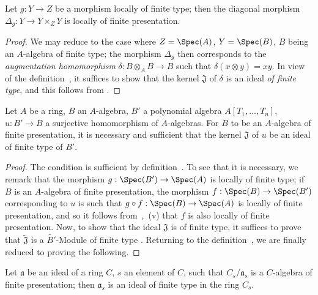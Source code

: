 \begin{corollary}[1.4.3.1]
\label{IV.1.4.3.1}
Let $g:Y\to Z$ be a morphism locally of finite type; then the diagonal morphism $\Delta_g:Y\to Y\times_Z Y$ is locally of finite presentation.
\end{corollary}

\begin{proof}
We may reduce to the case where $Z=\Spec(A)$, $Y=\Spec(B)$, $B$ being an $A$-algebra of finite type; the morphism $\Delta_g$ then corresponds to the \emph{augmentation homomorphism} $\delta:B\otimes_A B\to B$ such that $\delta(x\otimes y)=xy$.
In view of the definition~, it suffices to show that the kernel $\mathfrak{J}$ of $\delta$ is an ideal \emph{of finite type}, and this follows from .
\end{proof}

\begin{proposition}[1.4.4]
\label{IV.1.4.4}
Let $A$ be a ring, $B$ an $A$-algebra, $B'$ a polynomial algebra $A[T_1,\ldots,T_n]$, $u:B'\to B$ a surjective homomorphism of $A$-algebras.
For $B$ to be an $A$-algebra of finite presentation, it is necessary and sufficient that the kernel $\mathfrak{J}$ of $u$ be an ideal of finite type of $B'$.
\end{proposition}

\begin{proof}
The condition is sufficient by definition~.
To see that it is necessary, we remark that the morphism $g:\Spec(B')\to\Spec(A)$ is locally of finite type; if $B$ is an $A$-algebra of finite presentation, the morphism $f:\Spec(B)\to\Spec(B')$ corresponding to $u$ is such that $g\circ f:\Spec(B)\to\Spec(A)$ is locally of finite presentation, and so it follows from~,~(v) that $f$ is also locally of finite presentation.
Now, to show that the ideal $\mathfrak{J}$ is of finite type, it suffices to prove that $\widetilde{\mathfrak{J}}$ is a $\widetilde{B'}$-Module of finite type .
Returning to the definition~, we are finally reduced to proving the following.
\end{proof}

\begin{lemma}[1.4.4.1]
\label{IV.1.4.4.1}
Let $\mathfrak{a}$ be an ideal of a ring $C$, $s$ an element of $C$, such that $C_s/\mathfrak{a}_s$ is a $C$-algebra of finite presentation; then $\mathfrak{a}_s$ is an ideal of finite type in the ring $C_s$.
\end{lemma}

